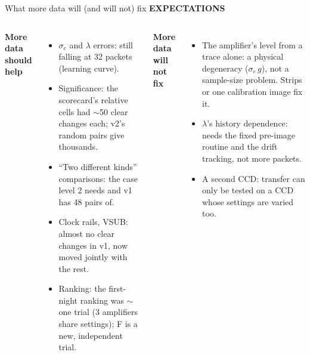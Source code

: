 \documentclass[aspectratio=169,11pt]{beamer}
\newcommand{\eyebrow}[2][trace]{{\color{#1}\scriptsize\bfseries\MakeUppercase{#2}}\par\vspace{0.1em}}
\begin{document}
\begin{frame}{What more data will (and will not) fix}
\eyebrow[image]{Expectations}
\begin{columns}[T]
\small
{\color{model}\bfseries More data should help}\par\scriptsize
\begin{itemize}
\item $\sigma_e$ and $\lambda$ errors: still falling at 32 packets (learning curve).
\item Significance: the scorecard's relative cells had $\sim$50 clear changes each; v2's random pairs give thousands.
\item ``Two different kinds'' comparisons: the case level 2 needs and v1 has 48 pairs of.
\item Clock rails, VSUB: almost no clear changes in v1, now moved jointly with the rest.
\item Ranking: the first-night ranking was $\sim$one trial (3 amplifiers share settings); F is a new, independent trial.
\end{itemize}
\small
{\color{problem}\bfseries More data will not fix}\par\scriptsize
\begin{itemize}
\item The amplifier's level from a trace alone: a physical degeneracy ($\sigma_e\,g$), not a sample-size problem. Strips or one calibration image fix it.
\item $\lambda$'s history dependence: needs the fixed pre-image routine and the drift tracking, not more packets.
\item A second CCD: transfer can only be tested on a CCD whose settings are varied too.
\end{itemize}
\end{columns}
\end{frame}
\end{document}
